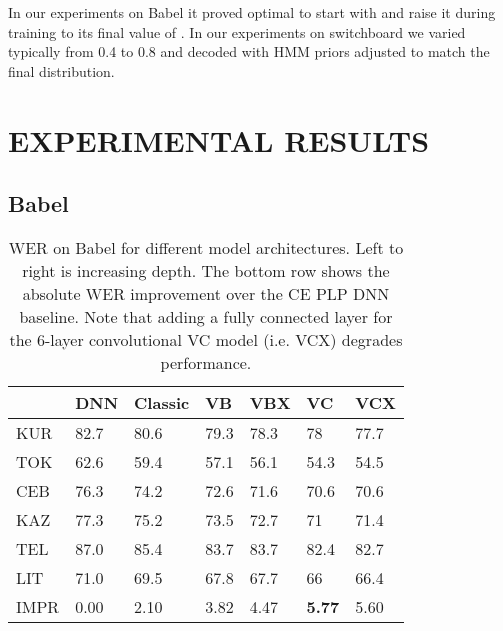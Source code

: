 \documentclass{article}
\begin{document}
In our experiments on Babel it proved optimal to start with  and raise
it during training to its final value of .
In our experiments on switchboard we varied  typically from 0.4 to 0.8
and decoded with HMM priors adjusted to match the final  distribution.

\section{EXPERIMENTAL RESULTS}

\subsection{Babel}
\label{ssec:babel}

\begin{table}[ht]
\centering
\begin{tabular}{l | l | lllll}
         & DNN     & Classic & VB   & VBX  & VC   & VCX  \\ \hline
KUR      & 82.7 & 80.6    & 79.3 & 78.3 & 78   & 77.7 \\
TOK      & 62.6 & 59.4    & 57.1 & 56.1 & 54.3 & 54.5 \\
CEB      & 76.3 & 74.2    & 72.6 & 71.6 & 70.6 & 70.6 \\
KAZ      & 77.3 & 75.2    & 73.5 & 72.7 & 71   & 71.4 \\
TEL      & 87.0 & 85.4    & 83.7 & 83.7 & 82.4 & 82.7 \\
LIT      & 71.0 & 69.5    & 67.8 & 67.7 & 66   & 66.4 \\ \hline
IMPR     & 0.00 & 2.10    & 3.82 & 4.47 & \bf{5.77} & 5.60
\end{tabular}
\caption{\label{tab:depth}WER on Babel for different model architectures. Left to right is increasing depth. 
    The bottom row shows the absolute WER improvement over the CE PLP DNN baseline.
    Note that adding a fully connected layer for the 6-layer convolutional VC model (i.e. VCX) degrades performance.
}
\end{table}
\end{document}
